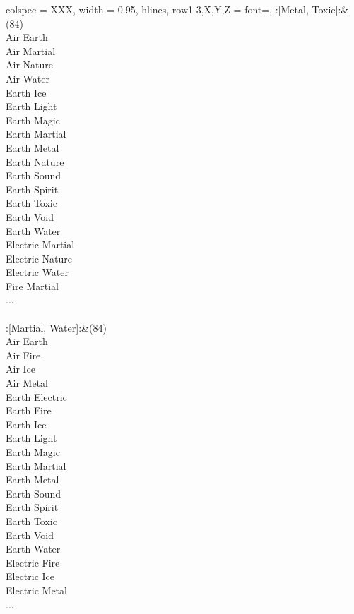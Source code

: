 \begin{longtblr}[
	caption = {2v2 Defending Weak},
	label = {2v2-Defending-Weak},
]{
	colspec = {XXX}, width = 0.95\linewidth,
	hlines,
	row{1-3,X,Y,Z} = {font=\bfseries},
}
	:[Metal, Toxic]:&{(84)\\
	Air Earth \\
	Air Martial \\
	Air Nature \\
	Air Water \\
	Earth Ice \\
	Earth Light \\
	Earth Magic \\
	Earth Martial \\
	Earth Metal \\
	Earth Nature \\
	Earth Sound \\
	Earth Spirit \\
	Earth Toxic \\
	Earth Void \\
	Earth Water \\
	Electric Martial \\
	Electric Nature \\
	Electric Water \\
	Fire Martial \\
	...\\
	}\\

	:[Martial, Water]:&{(84)\\
	Air Earth \\
	Air Fire \\
	Air Ice \\
	Air Metal \\
	Earth Electric \\
	Earth Fire \\
	Earth Ice \\
	Earth Light \\
	Earth Magic \\
	Earth Martial \\
	Earth Metal \\
	Earth Sound \\
	Earth Spirit \\
	Earth Toxic \\
	Earth Void \\
	Earth Water \\
	Electric Fire \\
	Electric Ice \\
	Electric Metal \\
	...\\
	}\\


\end{longtblr}
